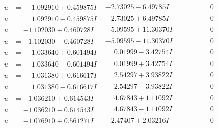 \documentclass[1p]{elsarticle_modified}
\theoremstyle{definition}
\begin{document}
$$\begin{array}{c|c|c}
\begin{aligned}
u &= \phantom{-}1.092910 + 0.459875 I\end{aligned}
 & -2.73025 - 6.49785 I & \phantom{-0.000000 } 0 \\ \hline\begin{aligned}
u &= \phantom{-}1.092910 - 0.459875 I\end{aligned}
 & -2.73025 + 6.49785 I & \phantom{-0.000000 } 0 \\ \hline\begin{aligned}
u &= -1.102030 + 0.460728 I\end{aligned}
 & -5.09595 + 11.30370 I & \phantom{-0.000000 } 0 \\ \hline\begin{aligned}
u &= -1.102030 - 0.460728 I\end{aligned}
 & -5.09595 - 11.30370 I & \phantom{-0.000000 } 0 \\ \hline\begin{aligned}
u &= \phantom{-}1.033640 + 0.601494 I\end{aligned}
 & \phantom{-}0.01999 - 3.42754 I & \phantom{-0.000000 } 0 \\ \hline\begin{aligned}
u &= \phantom{-}1.033640 - 0.601494 I\end{aligned}
 & \phantom{-}0.01999 + 3.42754 I & \phantom{-0.000000 } 0 \\ \hline\begin{aligned}
u &= \phantom{-}1.031380 + 0.616617 I\end{aligned}
 & \phantom{-}2.54297 + 3.93822 I & \phantom{-0.000000 } 0 \\ \hline\begin{aligned}
u &= \phantom{-}1.031380 - 0.616617 I\end{aligned}
 & \phantom{-}2.54297 - 3.93822 I & \phantom{-0.000000 } 0 \\ \hline\begin{aligned}
u &= -1.036210 + 0.614543 I\end{aligned}
 & \phantom{-}4.67843 + 1.11092 I & \phantom{-0.000000 } 0 \\ \hline\begin{aligned}
u &= -1.036210 - 0.614543 I\end{aligned}
 & \phantom{-}4.67843 - 1.11092 I & \phantom{-0.000000 } 0 \\ \hline\begin{aligned}
u &= -1.076910 + 0.561271 I\end{aligned}
 & -2.47407 + 2.03216 I & \phantom{-0.000000 } 0 \\ \hline\begin{aligned}

\end{aligned}
\end{array}$$
\end{document}
